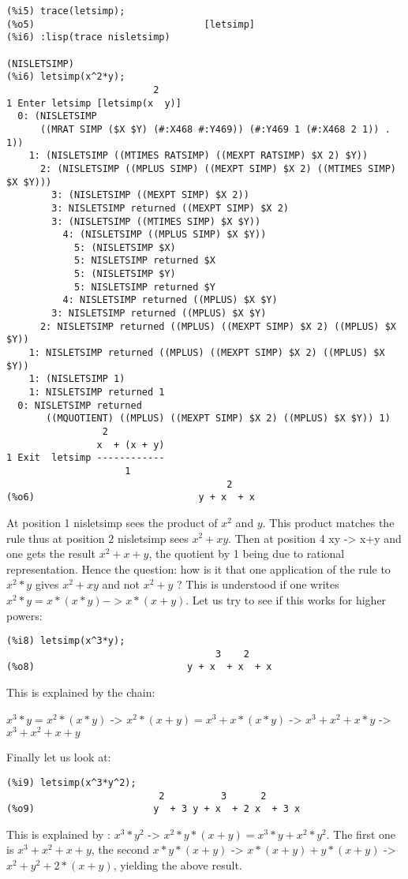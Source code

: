\documentclass[a4paper,11pt]{article}
\begin{document}
\begin{verbatim}
(%i5) trace(letsimp);
(%o5)                              [letsimp]
(%i6) :lisp(trace nisletsimp)

(NISLETSIMP)
(%i6) letsimp(x^2*y);
                          2
1 Enter letsimp [letsimp(x  y)]
  0: (NISLETSIMP
      ((MRAT SIMP ($X $Y) (#:X468 #:Y469)) (#:Y469 1 (#:X468 2 1)) . 1))
    1: (NISLETSIMP ((MTIMES RATSIMP) ((MEXPT RATSIMP) $X 2) $Y))
      2: (NISLETSIMP ((MPLUS SIMP) ((MEXPT SIMP) $X 2) ((MTIMES SIMP) $X $Y)))
        3: (NISLETSIMP ((MEXPT SIMP) $X 2))
        3: NISLETSIMP returned ((MEXPT SIMP) $X 2)
        3: (NISLETSIMP ((MTIMES SIMP) $X $Y))
          4: (NISLETSIMP ((MPLUS SIMP) $X $Y))
            5: (NISLETSIMP $X)
            5: NISLETSIMP returned $X
            5: (NISLETSIMP $Y)
            5: NISLETSIMP returned $Y
          4: NISLETSIMP returned ((MPLUS) $X $Y)
        3: NISLETSIMP returned ((MPLUS) $X $Y)
      2: NISLETSIMP returned ((MPLUS) ((MEXPT SIMP) $X 2) ((MPLUS) $X $Y))
    1: NISLETSIMP returned ((MPLUS) ((MEXPT SIMP) $X 2) ((MPLUS) $X $Y))
    1: (NISLETSIMP 1)
    1: NISLETSIMP returned 1
  0: NISLETSIMP returned
       ((MQUOTIENT) ((MPLUS) ((MEXPT SIMP) $X 2) ((MPLUS) $X $Y)) 1)
                 2
                x  + (x + y)
1 Exit  letsimp ------------
                     1
                                       2
(%o6)                             y + x  + x
\end{verbatim}
At position 1 nisletsimp sees the product of $x^2$ and $y$. This product
matches the rule thus at position 2 nisletsimp sees $x^2 + xy$. Then at
position 4 xy -> x+y and one gets the result $x^2+x+y$, the quotient by
1 being due to rational representation. Hence the question: how is it
that one application of the rule to $x^2*y$ gives $x^2+xy$ and not 
$x^2+y$ ? This is understood if one writes $x^2*y = x*(x*y) -> x*(x+y)$.
Let us try to see if this works for higher powers:
\begin{verbatim}
(%i8) letsimp(x^3*y);
                                     3    2
(%o8)                           y + x  + x  + x
\end{verbatim}
This is explained by the chain:

$x^3*y = x^2*(x*y)$ -> $x^2*(x+y) = x^3 + x*(x*y)$ -> $x^3 + x^2 + x*y$ -> $x^3+x^2+x+y$

Finally let us look at:
\begin{verbatim}
(%i9) letsimp(x^3*y^2);
                           2          3      2
(%o9)                     y  + 3 y + x  + 2 x  + 3 x
\end{verbatim}
This is explained by :
$x^3*y^2$ -> $x^2*y*(x+y) = x^3*y + x^2*y^2$. The first one is $x^3+x^2+x+y$, the second
$x*y*(x+y)$ -> $x*(x+y) + y*(x+y)$ ->  $x^2+y^2 +2*(x+y)$, yielding the above result.
\end{document}

